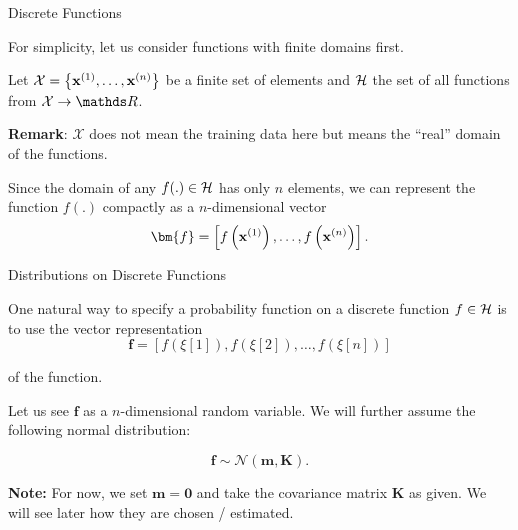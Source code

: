 \documentclass[11pt,compress,t,notes=noshow, xcolor=table]{beamer}
\begin{document}

\begin{vbframe}{Discrete Functions}

For simplicity, let us consider functions with finite domains first. \\

\lz


Let $\mathcal{X} = \left\{\mathbf{x}^{(1)}, \dots , \mathbf{x}^{(n)}\right\}$ be a finite set of elements and $\mathcal{H}$ the set of all functions from $\mathcal{X} \to \R$.

\textbf{Remark}: $\mathcal{X}$ does not mean the training data here but means the ``real'' domain of the functions.

\lz

Since the domain of any $f(.) \in \mathcal{H}$ has only $n$ elements, we can represent the function $f(.)$ compactly as a $n$-dimensional vector $$\bm{f} = \left[f\left(\xv^{(1)}\right), \dots, f\left(\xv^{(n)}\right)\right].$$
\end{vbframe}






\begin{vbframe}{Distributions on Discrete Functions}

\vspace*{0.5cm}

One natural way to specify a probability function on a discrete function $f \in \mathcal{H}$ is to use the vector representation
$$
  \bm{f} = \left[f\left(\xi[1]\right), f\left(\xi[2]\right), \dots, f\left(\xi[n]\right)\right]
$$


of the function.

\lz

Let us see $\bm{f}$ as a $n$-dimensional random variable. We will further assume the following normal distribution:

$$
  \bm{f} \sim \mathcal{N}\left(\bm{m}, \bm{K}\right).
$$

\textbf{Note: } For now, we set $\bm{m} = \bm{0}$ and take the covariance matrix $\bm{K}$ as given. We will see later how they are chosen / estimated.

\end{vbframe}
\end{document}
